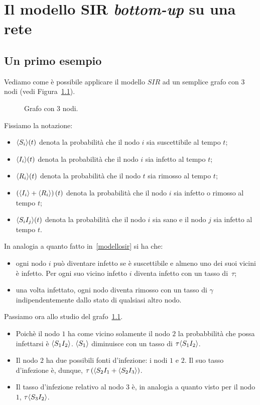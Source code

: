 \chapter{Il modello SIR \textit{bottom-up} su una rete}
\section{Un primo esempio}
Vediamo come \`e possibile applicare il modello $SIR$ ad un semplice grafo con 3 nodi (vedi Figura~\ref{fig::3nodi}).\\
\begin{figure}[h]
\centering
{}	

\caption{Grafo con 3 nodi.}
\label{fig::3nodi}
\end{figure}
Fissiamo la notazione:
\begin{itemize}
	\item  $\langle S_i \rangle(t)$  denota la probabilit\`a che il nodo $i$ sia suscettibile al tempo $t$;
	\item   $\langle I_i \rangle(t)$  denota la probabilit\`a che il nodo $i$ sia infetto al tempo $t$;
	\item  $\langle R_i \rangle(t)$  denota la probabilit\`a che il nodo $t$ sia rimosso al tempo $t$;
	\item $\left(  \langle  I_i \rangle+ \langle  R_i \rangle \right)(t)$ denota la probabilit\`a che il nodo $i$ sia infetto o rimosso al tempo $t$;
	\item $\langle S_iI_j \rangle(t)$ denota la probabilit\`a che il nodo $i$ sia sano e il nodo $j$ sia infetto al tempo $t$.
	\end{itemize}
In analogia a quanto fatto in~\ref{modellosir} si ha che:
\begin{itemize}
	\item ogni nodo $i$ pu\`o diventare infetto se \`e suscettibile e almeno uno dei suoi vicini \`e infetto. Per ogni suo vicino infetto $i$ diventa infetto con un tasso di~$\tau$;
	\item una volta infettato, ogni nodo diventa rimosso con un tasso di $\gamma$ indipendentemente dallo stato di qualsiasi altro nodo.
\end{itemize}
\newpage
Passiamo ora allo studio del grafo~\ref{fig::3nodi}.
\begin{itemize}
	

\item Poich\`e il nodo $1$ ha come vicino solamente il nodo $2$ la probabbilit\`a che possa infettarsi \`e $\langle S_1 I_2 \rangle $. $\langle S_1 \rangle$ diminuisce con un tasso di $\tau \langle S_1 I_2 \rangle$.
\item Il nodo $2$ ha due possibili fonti d'infezione: i nodi $1$ e $2$. Il suo tasso d'infezione \`e, dunque,  $\tau \left(  \langle{S_2I_1} + \langle S_2 I_3 \rangle \right)$.
\item Il tasso d'infezione relativo al nodo $3$ \`e,  
in analogia a quanto visto per il nodo $1$, $\tau\langle S_3I_2 \rangle$.
\end{itemize}
